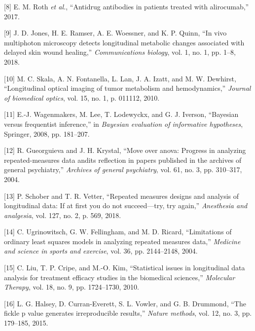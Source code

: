 \documentclass[
]{article}
\begin{document}
\leavevmode\hypertarget{ref-roth2017}{}%
{[}8{]} E. M. Roth \emph{et al.}, ``Antidrug antibodies in patients
treated with alirocumab,'' 2017.

\leavevmode\hypertarget{ref-jones2018}{}%
{[}9{]} J. D. Jones, H. E. Ramser, A. E. Woessner, and K. P. Quinn, ``In
vivo multiphoton microscopy detects longitudinal metabolic changes
associated with delayed skin wound healing,'' \emph{Communications
biology}, vol. 1, no. 1, pp. 1--8, 2018.

\leavevmode\hypertarget{ref-skala2010}{}%
{[}10{]} M. C. Skala, A. N. Fontanella, L. Lan, J. A. Izatt, and M. W.
Dewhirst, ``Longitudinal optical imaging of tumor metabolism and
hemodynamics,'' \emph{Journal of biomedical optics}, vol. 15, no. 1, p.
011112, 2010.

\leavevmode\hypertarget{ref-wagenmakers2008}{}%
{[}11{]} E.-J. Wagenmakers, M. Lee, T. Lodewyckx, and G. J. Iverson,
``Bayesian versus frequentist inference,'' in \emph{Bayesian evaluation
of informative hypotheses}, Springer, 2008, pp. 181--207.

\leavevmode\hypertarget{ref-gueorguieva2004}{}%
{[}12{]} R. Gueorguieva and J. H. Krystal, ``Move over anova: Progress
in analyzing repeated-measures data andits reflection in papers
published in the archives of general psychiatry,'' \emph{Archives of
general psychiatry}, vol. 61, no. 3, pp. 310--317, 2004.

\leavevmode\hypertarget{ref-schober2018}{}%
{[}13{]} P. Schober and T. R. Vetter, ``Repeated measures designs and
analysis of longitudinal data: If at first you do not succeed---try, try
again,'' \emph{Anesthesia and analgesia}, vol. 127, no. 2, p. 569, 2018.

\leavevmode\hypertarget{ref-ugrinowitsch2004}{}%
{[}14{]} C. Ugrinowitsch, G. W. Fellingham, and M. D. Ricard,
``Limitations of ordinary least squares models in analyzing repeated
measures data,'' \emph{Medicine and science in sports and exercise},
vol. 36, pp. 2144--2148, 2004.

\leavevmode\hypertarget{ref-liu2010}{}%
{[}15{]} C. Liu, T. P. Cripe, and M.-O. Kim, ``Statistical issues in
longitudinal data analysis for treatment efficacy studies in the
biomedical sciences,'' \emph{Molecular Therapy}, vol. 18, no. 9, pp.
1724--1730, 2010.

\leavevmode\hypertarget{ref-halsey2015}{}%
{[}16{]} L. G. Halsey, D. Curran-Everett, S. L. Vowler, and G. B.
Drummond, ``The fickle p value generates irreproducible results,''
\emph{Nature methods}, vol. 12, no. 3, pp. 179--185, 2015.
\end{document}

